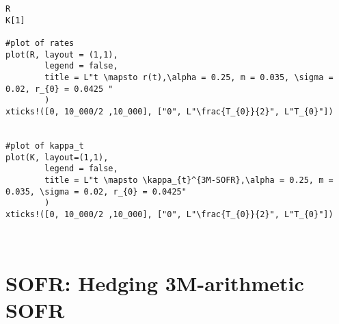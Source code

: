 \begin{verbatim}
R
K[1]

#plot of rates
plot(R, layout = (1,1), 
        legend = false,
        title = L"t \mapsto r(t),\alpha = 0.25, m = 0.035, \sigma = 0.02, r_{0} = 0.0425 "
        )
xticks!([0, 10_000/2 ,10_000], ["0", L"\frac{T_{0}}{2}", L"T_{0}"])


#plot of kappa_t
plot(K, layout=(1,1), 
        legend = false, 
        title = L"t \mapsto \kappa_{t}^{3M-SOFR},\alpha = 0.25, m = 0.035, \sigma = 0.02, r_{0} = 0.0425"
        )
xticks!([0, 10_000/2 ,10_000], ["0", L"\frac{T_{0}}{2}", L"T_{0}"]) 



\end{verbatim}

\newpage 

\section{SOFR: Hedging 3M-arithmetic SOFR}
